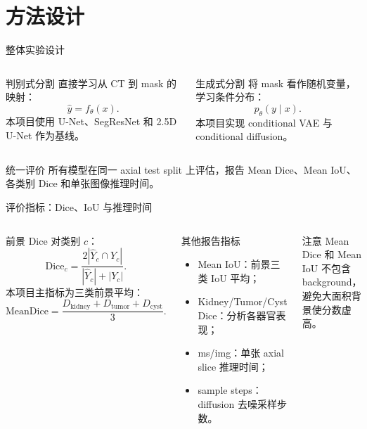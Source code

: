 \documentclass[10pt]{beamer}
\newcommand{\model}[1]{\textsf{#1}}
\begin{document}
\section{方法设计}

\begin{frame}{整体实验设计}
  \begin{columns}[T]
      \begin{exampleblock}{判别式分割}
        直接学习从 CT 到 mask 的映射：
        \[
          \hat y=f_\theta(x).
        \]
        本项目使用 U-Net、SegResNet 和 2.5D U-Net 作为基线。
      \end{exampleblock}
      \begin{alertblock}{生成式分割}
        将 mask 看作随机变量，学习条件分布：
        \[
          p_\theta(y\mid x).
        \]
        本项目实现 conditional VAE 与 conditional diffusion。
      \end{alertblock}
  \end{columns}
  \vspace{0.5em}
  \begin{block}{统一评价}
    所有模型在同一 axial test split 上评估，报告 Mean Dice、Mean IoU、各类别 Dice 和单张图像推理时间。
  \end{block}
\end{frame}

\begin{frame}{评价指标：Dice、IoU 与推理时间}
  \begin{columns}[T]
      \begin{block}{前景 Dice}
        对类别 $c$：
        \[
          \mathrm{Dice}_c
          =
          \frac{2|\hat Y_c\cap Y_c|}
          {|\hat Y_c|+|Y_c|}.
        \]
        本项目主指标为三类前景平均：
        \[
          \mathrm{MeanDice}
          =
          \frac{D_{\mathrm{kidney}}+D_{\mathrm{tumor}}+D_{\mathrm{cyst}}}{3}.
        \]
      \end{block}
      \begin{exampleblock}{其他报告指标}
        \begin{itemize}
          \item \model{Mean IoU}：前景三类 IoU 平均；
          \item \model{Kidney/Tumor/Cyst Dice}：分析各器官表现；
          \item \model{ms/img}：单张 axial slice 推理时间；
          \item \model{sample steps}：diffusion 去噪采样步数。
        \end{itemize}
      \end{exampleblock}
      \begin{alertblock}{注意}
        Mean Dice 和 Mean IoU 不包含 background，避免大面积背景使分数虚高。
      \end{alertblock}
  \end{columns}
\end{frame}
\end{document}
